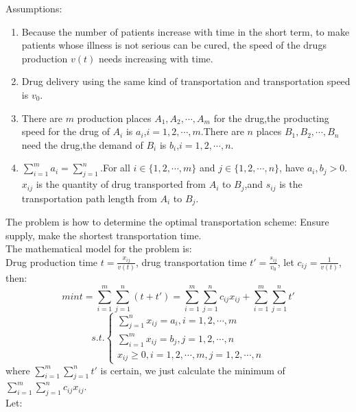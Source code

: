 Assumptions:
\begin{enumerate}
  \item Because the number of patients increase with time in the short
term, to make patients whose illness is not serious can be
cured, the speed of the drugs production $ v(t) $ needs
increasing with time.
  \item Drug delivery using the same kind of transportation and
transportation speed is $ v_0 $.
  \item There are $ m $ production places $ A_1,A_2,\cdots,A_m $
for the drug,the producting speed for the drug of $ A_i $ is
$ a_i $,$ i=1,2,\cdots,m $.There are $ n $ places $
B_1,B_2,\cdots,B_n $ need the drug,the demand of $ B_i $ is
$ b_i $,$ i=1,2,\cdots,n $.
  \item $ \sum_{i=1}^{m}a_i=\sum_{j=1}^{n} $.For all
$ i\in\{1,2,\cdots,m\} $ and $ j\in\{1,2,\cdots,n\} $, have
$ a_i,b_j>0 $.
$ x_{ij} $ is the quantity of drug transported from $ A_i $ to
$ B_j $,and $ s_{ij} $ is the transportation path length from
$ A_i $ to $ B_j $.
\end{enumerate}\par
The problem is how to determine the optimal transportation
scheme:
Ensure supply, make the shortest transportation time.\\
The mathematical model for the problem is:\\
Drug production time $ t=\frac{x_{ij}}{v(t)} $, drug
transportation time $ t'=\frac{s_{ij}}{v_0} $, let
$ c_{ij}=\frac{1}{v(t)} $, then:
\begin{equation}
min t=\sum_{i=1}^{m}\sum_{j=1}^{n}(t+t')=
\sum_{i=1}^{m}\sum_{j=1}^{n}c_{ij}x_{ij} + 
\sum_{i=1}^{m}\sum_{j=1}^{n}t'
\label{equ:31}
\end{equation}
$$
s.t. \left\{
\begin{array}{l}
  \sum_{j=1}^{n}x_{ij}=a_i,i=1,2,\cdots,m \\
  \sum_{i=1}^{m}x_{ij}=b_j,j=1,2,\cdots,n \\
  x_{ij}\geq 0,i=1,2,\cdots,m, j=1,2,\cdots,n
\end{array}\right.
$$
where $ \sum_{i=1}^{m}\sum_{j=1}^{n}t' $ is certain, 
we just calculate the minimum of 
$ \sum_{i=1}^{m}\sum_{j=1}^{n}c_{ij}x_{ij} $.\\
Let:
